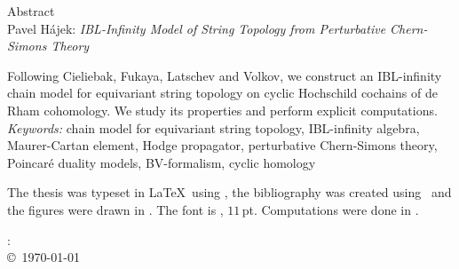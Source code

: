 \documentclass[\MainFolder/Text.tex]{subfiles}
\begin{document}
\begin{center}
  {\LARGE Abstract}\\[0.5cm]
  Pavel H\'ajek: {\itshape IBL-Infinity Model of String Topology from Perturbative Chern-Simons Theory}
\end{center}

Following Cieliebak, Fukaya, Latschev and Volkov, we construct an IBL-infinity chain model for equivariant string topology on cyclic Hochschild cochains of de Rham cohomology. We study its properties and perform explicit computations.\vspace{.8cm}\\
\noindent \emph{Keywords:} chain model for equivariant string topology, IBL-infinity algebra, Maurer-Cartan element, Hodge propagator, perturbative Chern-Simons theory, Poincar\'e duality models, BV-formalism, cyclic homology
\clearpage 
{\null\vfill
\begin{center} The thesis was typeset in \LaTeX\ using \Komaname, the bibliography was created using \Biblatexname\ and the figures were drawn in \Tikzname. The font is \Libertinename, $11$\,pt. Computations were done in \Mathematicaname.
\end{center}
\makeatletter
\begin{center}
\@author: \textit{\@title} \\ 
\copyright\ \today \\
\end{center}
\makeatother
}
\end{document}
